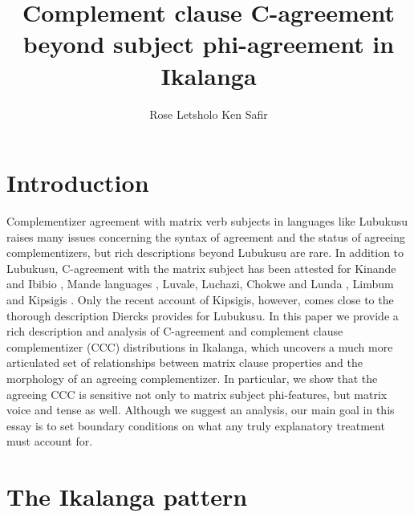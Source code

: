 \documentclass[output=paper,
modfonts
]{langscibook}
\title{Complement clause C-agreement beyond subject phi-agreement in Ikalanga}
\author{%
 Rose Letsholo\affiliation{University of Botswana}\lastand
 Ken Safir\affiliation{Rutgers University}
}
\begin{document}
\maketitle

\section{Introduction} 

Complementizer agreement with matrix verb subjects in languages like Lubukusu \citep{Diercks2013} raises many issues concerning the syntax of agreement and the status of agreeing complementizers, but rich descriptions beyond Lubukusu are rare. In addition to Lubukusu, C-agreement with the matrix subject has been attested for Kinande and Ibibio \citep{Baker2008}, Mande languages \citep{Idiatov2010}, Luvale, Luchazi, Chokwe and Lunda \citep{Kawasha2007}, Limbum \citep{Nformi2017a} and Kipsigis \citep{Diercks2017}. Only the recent account of Kipsigis, however, comes close to the thorough description Diercks provides for Lubukusu. In this paper we  provide a rich description and analysis of C-agreement and complement clause complementizer (CCC) distributions in Ikalanga, which uncovers a much more articulated set of relationships between matrix clause properties and the morphology of an agreeing complementizer. In particular, we show that the agreeing CCC is sensitive not only to matrix subject phi-features, but matrix voice and tense as well. Although we suggest an analysis, our main goal in this essay is to set boundary conditions on what any truly explanatory treatment must account for.

\section{The Ikalanga pattern}
\end{document}
